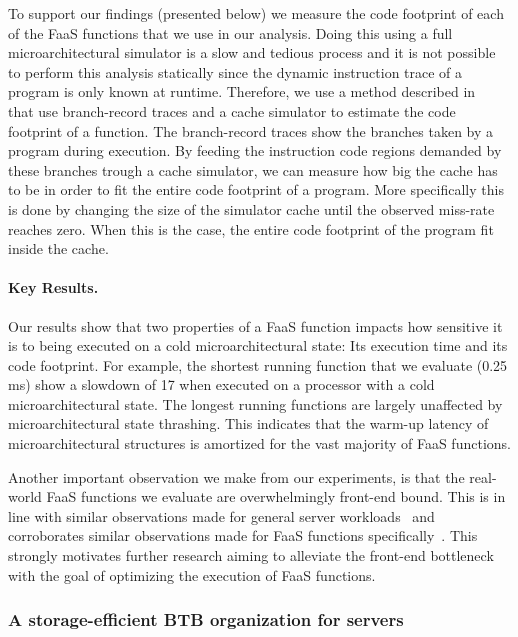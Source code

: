 \documentclass[../main.tex]{subfiles}
\begin{document}
\begin{refsection}
To support our findings (presented below) we measure the code
footprint of each of the FaaS functions that we use in our
analysis. Doing this using a full microarchitectural simulator is a
slow and tedious process and it is not possible to perform this
analysis statically since the dynamic instruction trace of a program
is only known at runtime.  Therefore, we use a method described
in~\cite{splash2} that use branch-record traces and a cache simulator
to estimate the code footprint of a function. The branch-record traces
show the branches taken by a program during execution. By feeding the
instruction code regions demanded by these branches trough a cache
simulator, we can measure how big the cache has to be in order to fit
the entire code footprint of a program. More specifically this is done
by changing the size of the simulator cache until the observed
miss-rate reaches zero. When this is the case, the entire code
footprint of the program fit inside the cache.


\paragraph{Key Results.}
Our results show that two properties of a FaaS function impacts how
sensitive it is to being executed on a cold microarchitectural state:
Its execution time and its code footprint. For example, the shortest
running function that we evaluate (0.25 ms) show a slowdown of
17\texttimes{} when executed on a processor with a cold microarchitectural
state. The longest running functions are largely unaffected by
microarchitectural state thrashing. This indicates that the warm-up
latency of microarchitectural structures is amortized for the vast
majority of FaaS functions.

Another important observation we make from our experiments, is that
the real-world FaaS functions we evaluate are overwhelmingly front-end
bound. This is in line with similar observations made for general
server
workloads~\cite{ferdman12_clear_cloud,kanev15_profil,ayers19_asmdb}
and corroborates similar observations made for FaaS functions specifically~\cite{lukewarm_serverless}. This
strongly motivates further research aiming to alleviate the front-end
bottleneck with the goal of optimizing the execution of FaaS
functions.



\subsubsection{A storage-efficient BTB organization for servers}
\label{subsub:btbx}


\end{refsection}
\end{document}
